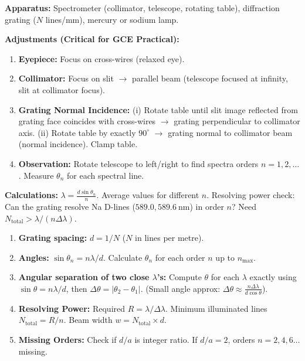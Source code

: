 \documentclass[11pt]{article}
\begin{document}
\begin{experience}
\textbf{Apparatus:} Spectrometer (collimator, telescope, rotating table), diffraction grating ($N$ lines/mm), mercury or sodium lamp.

\textbf{Adjustments (Critical for GCE Practical):}
\begin{enumerate}
\item \textbf{Eyepiece:} Focus on cross-wires (relaxed eye).
\item \textbf{Collimator:} Focus on slit $\rightarrow$ parallel beam (telescope focused at infinity, slit at collimator focus).
\item \textbf{Grating Normal Incidence:} (i) Rotate table until slit image reflected from grating face coincides with cross-wires $\rightarrow$ grating perpendicular to collimator axis. (ii) Rotate table by exactly $90^\circ$ $\rightarrow$ grating normal to collimator beam (normal incidence). Clamp table.
\item \textbf{Observation:} Rotate telescope to left/right to find spectra orders $n=1,2,\dots$. Measure $\theta_n$ for each spectral line.
\end{enumerate}

\textbf{Calculations:}
$\lambda = \frac{d\sin\theta_n}{n}$. Average values for different $n$.
Resolving power check: Can the grating resolve Na D-lines ($589.0, 589.6\ \mathrm{nm}$) in order $n$? Need $N_{\text{total}} > \lambda/(n\Delta\lambda)$.
\end{experience}

\begin{methode}
\begin{enumerate}
\item \textbf{Grating spacing:} $d = 1/N$ ($N$ in lines per metre).
\item \textbf{Angles:} $\sin\theta_n = n\lambda/d$. Calculate $\theta_n$ for each order $n$ up to $n_{\max}$.
\item \textbf{Angular separation of two close $\lambda$'s:} Compute $\theta$ for each $\lambda$ exactly using $\sin\theta = n\lambda/d$, then $\Delta\theta = |\theta_2 - \theta_1|$. (Small angle approx: $\Delta\theta \approx \frac{n\Delta\lambda}{d\cos\theta}$).
\item \textbf{Resolving Power:} Required $R = \lambda/\Delta\lambda$. Minimum illuminated lines $N_{\text{total}} = R/n$. Beam width $w = N_{\text{total}} \times d$.
\item \textbf{Missing Orders:} Check if $d/a$ is integer ratio. If $d/a = 2$, orders $n=2,4,6\dots$ missing.
\end{enumerate}
\end{methode}
\end{document}
